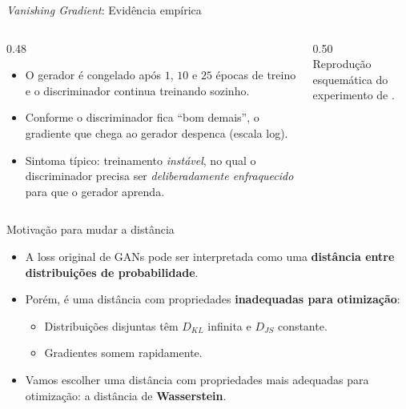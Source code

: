 \documentclass[aspectratio=169,xcolor=dvipsnames]{beamer}
\begin{document}
  \begin{frame}{\textit{Vanishing Gradient}: Evidência empírica}
    \begin{columns}[T]
      \begin{column}{0.48\textwidth}
        \begin{itemize}
          \item O gerador é congelado após $1$, $10$ e $25$ épocas de
          treino e o discriminador continua treinando sozinho.
          \item Conforme o discriminador fica ``bom demais'', o
          gradiente que chega ao gerador despenca (escala log).
          \item Sintoma típico: treinamento \emph{instável}, no qual o
          discriminador precisa ser \emph{deliberadamente enfraquecido}
          para que o gerador aprenda.
        \end{itemize}
      \end{column}
      \begin{column}{0.50\textwidth}
        \centering
        \vanishinggradientfigure\\
        \tiny Reprodução esquemática do experimento de
        .
      \end{column}
    \end{columns}
  \end{frame}

  \begin{frame}{Motivação para mudar a distância}
    \begin{itemize}
      \item A loss original de GANs pode ser interpretada
      como uma \textbf{distância entre distribuições de probabilidade}.
      \item Porém, é uma distância com propriedades \textbf{inadequadas
      para otimização}:
      \begin{itemize}
        \item Distribuições disjuntas têm $D_{KL}$ infinita e
        $D_{JS}$ constante.
        \item Gradientes somem rapidamente.
      \end{itemize}
      \item Vamos escolher uma distância com propriedades mais
      adequadas para otimização: a distância de \textbf{Wasserstein}.
    \end{itemize}
  \end{frame}
\end{document}

